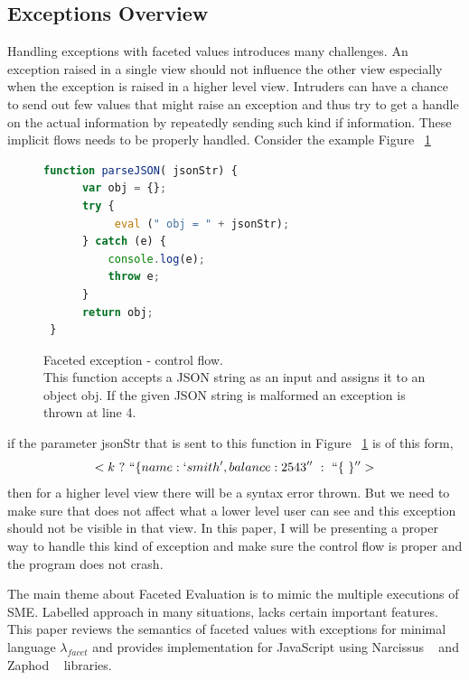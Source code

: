 \subsection{Exceptions Overview}

Handling exceptions with faceted values introduces many challenges. An exception raised in a single view should not influence the other view especially when the exception is raised in a higher level view. Intruders can have a chance to send out few values that might raise an exception and thus try to get a handle on the actual information by repeatedly sending such kind if information. These implicit flows needs to be properly handled. Consider the example Figure ~\ref{fig:facetExcepCF}
\begin{figure}[h]
  \centering
\begin{lstlisting}[language=JavaScript] 
 function parseJSON( jsonStr) {
      var obj = {};
      try {
           eval (" obj = " + jsonStr);
      } catch (e) {
          console.log(e);
          throw e;
      }
      return obj;
 }
\end{lstlisting}
\caption[Faceted exception - control flow.]
    {Faceted exception - control flow. \\ This function accepts a JSON string as an input and assigns it to an object obj. If the given JSON string is malformed an exception is thrown at line 4.}
    \label{fig:facetExcepCF}
\end{figure}

if the parameter jsonStr that is sent to this function in Figure ~\ref{fig:facetExcepCF} is of this form,
$$
 <k\ ?\ ``\{name:`smith', balance:2543''\ :\ ``\{\ \}''>  
$$
then for a higher level view there will be a syntax error thrown. But we need to make sure that does not affect what a lower level user can see and this exception should not be visible in that view. In this paper, I will be presenting a proper way to handle this kind of exception and make sure the control flow is proper and the program does not crash.


The main theme about Faceted Evaluation is to mimic the multiple executions of SME. Labelled approach in many situations, lacks certain important features. This paper reviews the semantics of faceted values with exceptions for minimal language $\lambda_{facet}$ and provides implementation for JavaScript using Narcissus ~\cite{kuno} and Zaphod ~\cite{Zaphod} libraries. 

